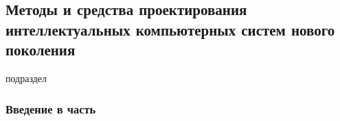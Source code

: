 \begin{partbacktext}
\part{Методы и средства проектирования интеллектуальных компьютерных систем нового поколения}
\label{part_design}
\noindent

\begin{scnrelfromlist}{подраздел}
\end{scnrelfromlist}

\section*{Введение в часть \ref{part_design}}


\end{partbacktext}
